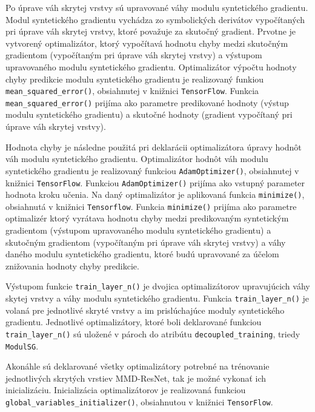 Po úprave váh skrytej vrstvy sú upravované váhy modulu syntetického gradientu. Modul syntetického gradientu vychádza zo symbolických derivátov vypočítaných pri úprave váh skrytej vrstvy, ktoré považuje za skutočný gradient. Prvotne je vytvorený optimalizátor, ktorý vypočítavá hodnotu chyby medzi skutočným gradientom (vypočítaným pri úprave váh skrytej vrstvy) a výstupom upravovaného modulu syntetického gradientu. Optimalizátor výpočtu hodnoty chyby predikcie modulu syntetického gradientu je realizovaný funkiou \texttt{mean_squared_error()}, obsiahnutej v knižnici \texttt{TensorFlow}. Funkcia \texttt{mean_squared_error()} prijíma ako parametre predikované hodnoty (výstup modulu syntetického gradientu) a skutočné hodnoty (gradient vypočítaný pri úprave váh skrytej vrstvy).

Hodnota chyby je následne použitá pri deklarácii optimalizátora úpravy hodnôt váh modulu syntetického gradientu. Optimalizátor hodnôt váh modulu syntetického gradientu je realizovaný funkciou \texttt{AdamOptimizer()}, obsiahnutej v knižnici \texttt{TensorFlow}. Funkciou \texttt{AdamOptimizer()} prijíma ako vstupný parameter hodnota kroku učenia. Na daný optimalizátor je aplikovaná funkcia \texttt{minimize()}, obsiahnutá v knižnici \texttt{Tensorflow}. Funkcia \texttt{minimize()} prijíma ako parametre optimalizér ktorý vyrátava hodnotu chyby medzi predikovaným syntetickým gradientom (výstupom upravovaného modulu syntetického gradientu) a skutočným gradientom (vypočítaným pri úprave váh skrytej vrstvy) a váhy daného modulu syntetického gradientu, ktoré budú upravované za účelom znižovania hodnoty chyby predikcie.

Výstupom funkcie \texttt{train_layer_n()} je dvojica optimalizátorov upravujúcich váhy skytej vrstvy a váhy modulu syntetického gradientu. Funkcia \texttt{train_layer_n()} je volaná pre jednotlivé skryté vrstvy a im prislúchajúce moduly syntetického gradientu. Jednotlivé optimalizátory, ktoré boli deklarované funkciou \texttt{train_layer_n()} sú uložené v pároch do atribútu \texttt{decoupled_training}, triedy \texttt{ModulSG}. 

Akonáhle sú deklarované všetky optimalizátory potrebné na trénovanie jednotlivých skrytých vrstiev MMD-ResNet, tak je možné vykonať ich inicializáciu. Inicializácia optimalizátorov je realizovaná funkciou \texttt{global_variables_initializer()}, obsiahnutou v knižnici \texttt{TensorFlow}.

